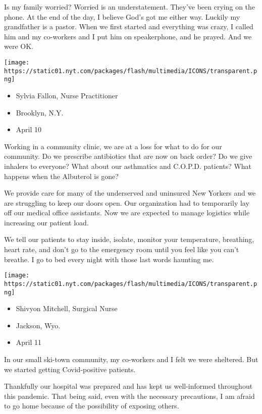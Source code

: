 Is my family worried? Worried is an understatement. They've been crying
on the phone. At the end of the day, I believe God's got me either way.
Luckily my grandfather is a pastor. When we first started and everything
was crazy, I called him and my co-workers and I put him on speakerphone,
and he prayed. And we were OK.

\texttt{[image: https://static01.nyt.com/packages/flash/multimedia/ICONS/transparent.png]}

\begin{itemize}
\tightlist
\item
  Sylvia Fallon, Nurse Practitioner
\item
  Brooklyn, N.Y.
\item
  April 10
\end{itemize}

Working in a community clinic, we are at a loss for what to do for our
community. Do we prescribe antibiotics that are now on back order? Do we
give inhalers to everyone? What about our asthmatics and C.O.P.D.
patients? What happens when the Albuterol is gone?

We provide care for many of the underserved and uninsured New Yorkers
and we are struggling to keep our doors open. Our organization had to
temporarily lay off our medical office assistants. Now we are expected
to manage logistics while increasing our patient load.

We tell our patients to stay inside, isolate, monitor your temperature,
breathing, heart rate, and don't go to the emergency room until you feel
like you can't breathe. I go to bed every night with those last words
haunting me.

\texttt{[image: https://static01.nyt.com/packages/flash/multimedia/ICONS/transparent.png]}

\begin{itemize}
\tightlist
\item
  Shivyon Mitchell, Surgical Nurse
\item
  Jackson, Wyo.
\item
  April 11
\end{itemize}

In our small ski-town community, my co-workers and I felt we were
sheltered. But we started getting Covid-positive patients.

Thankfully our hospital was prepared and has kept us well-informed
throughout this pandemic. That being said, even with the necessary
precautions, I am afraid to go home because of the possibility of
exposing others.

